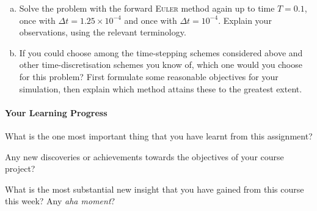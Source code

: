 \begin{enumerate}[(a)]
\vspace{6cm}

\item%
Solve the problem with the forward \textsc{Euler} method again up to time $T=0.1$, once with $\Delta t = 1.25 \times 10^{-4}$ and once with $\Delta t = 10^{-4}$. Explain your observations, using the relevant terminology.

\vspace{6cm}

\item%
If you could choose among the time-stepping schemes considered above and other time-discretisation schemes you know of, which one would you choose for this problem? First formulate some reasonable objectives for your simulation, then explain which method attains these to the greatest extent.
\end{enumerate}
\newpage

\mbox{}

\vfill

\paragraph*{Your Learning Progress}%

What is the one most important thing that you have learnt from this assignment?

\vspace*{3mm}
\hrulefill

\vspace*{3mm}
\hrulefill

Any new discoveries or achievements towards the objectives of your course project?

\vspace*{3mm}
\hrulefill

\vspace*{3mm}
\hrulefill

What is the most substantial new insight that you have gained from this course this week? Any \emph{aha moment}?

\vspace*{3mm}
\hrulefill

\vspace*{3mm}
\hrulefill


